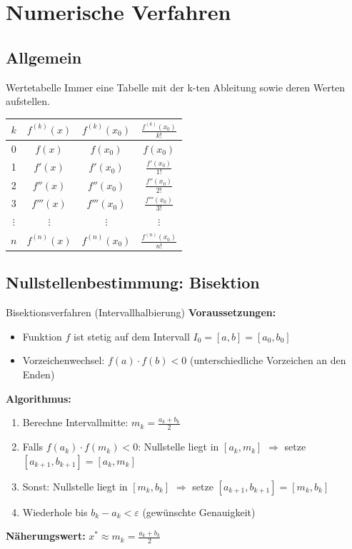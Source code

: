 \documentclass[a4paper,fontsize = 7pt]{scrartcl}
\begin{document}
\section{Numerische Verfahren}

\subsection{Allgemein}
\begin{mainbox}{Wertetabelle}
	Immer eine Tabelle mit der k-ten Ableitung sowie deren Werten aufstellen.
	\begin{tabular}{|c|c|c|c|}
		\hline
		$k$ & $f^{(k)}(x)$ & $f^{(k)}(x_0)$ & $\frac{f^{(k)}(x_0)}{k!}$ \\
		\hline
		0 & $f(x)$ & $f(x_0)$ & $f(x_0)$ \\
		\hline
		1 & $f'(x)$ & $f'(x_0)$ & $\frac{f'(x_0)}{1!}$ \\
		\hline
		2 & $f''(x)$ & $f''(x_0)$ & $\frac{f''(x_0)}{2!}$ \\
		\hline
		3 & $f'''(x)$ & $f'''(x_0)$ & $\frac{f'''(x_0)}{3!}$ \\
		\hline
		$\vdots$ & $\vdots$ & $\vdots$ & $\vdots$ \\
		\hline
		$n$ & $f^{(n)}(x)$ & $f^{(n)}(x_0)$ & $\frac{f^{(n)}(x_0)}{n!}$ \\
		\hline
	\end{tabular}
\end{mainbox}

\subsection{Nullstellenbestimmung: Bisektion}

\begin{mainbox}{Bisektionsverfahren (Intervallhalbierung)}
\textbf{Voraussetzungen:}
\begin{itemize}
	\item Funktion $f$ ist stetig auf dem Intervall $I_0 = [a, b] = [a_0, b_0]$
	\item Vorzeichenwechsel: $f(a) \cdot f(b) < 0$ (unterschiedliche Vorzeichen an den Enden)
\end{itemize}

\textbf{Algorithmus:}
\begin{enumerate}
	\item Berechne Intervallmitte: $m_k = \frac{a_k + b_k}{2}$
	\item Falls $f(a_k) \cdot f(m_k) < 0$: Nullstelle liegt in $[a_k, m_k]$
	      $\Rightarrow$ setze $[a_{k+1}, b_{k+1}] = [a_k, m_k]$
	\item Sonst: Nullstelle liegt in $[m_k, b_k]$
	      $\Rightarrow$ setze $[a_{k+1}, b_{k+1}] = [m_k, b_k]$
	\item Wiederhole bis $b_k - a_k < \varepsilon$ (gewünschte Genauigkeit)
\end{enumerate}

\textbf{Näherungswert:} $x^* \approx m_k = \frac{a_k + b_k}{2}$
\end{mainbox}
\end{document}
